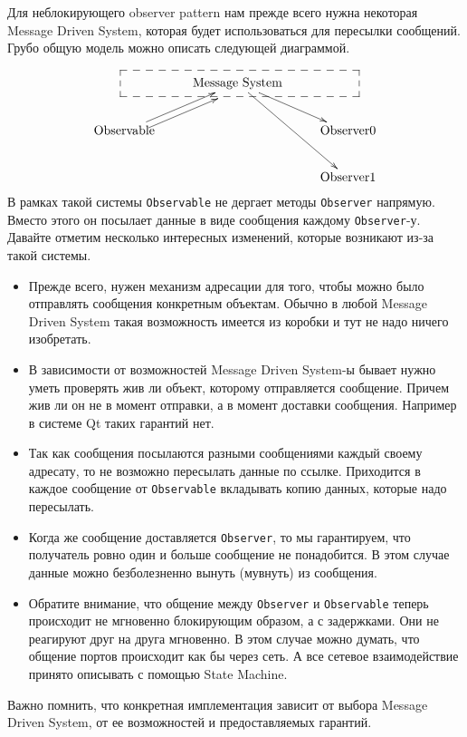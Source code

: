 Для неблокирующего observer pattern нам прежде всего нужна некоторая Message Driven System, которая будет использоваться для пересылки сообщений.
Грубо общую модель можно описать следующей диаграммой.

\[
\xymatrix{
  {\vphantom{\text{Message System}}}
    {\save
  [].[rr]*+[F--]\frm{}
  \restore
  }  
  &{\text{Message System}}\ar[rd]\ar[rdd]&{}\\
  {\text{Observable}}\ar[ru]<-0.5em>\ar[ru]&{}&{\text{Observer0}}\\
  {}&{}&{\text{Observer1}}\\
}
\]
В рамках такой системы \verb"Observable" не дергает методы \verb"Observer" напрямую.
Вместо этого он посылает данные в виде сообщения каждому \verb"Observer"-у.
Давайте отметим несколько интересных изменений, которые возникают из-за такой системы.
\begin{itemize}
\item Прежде всего, нужен механизм адресации для того, чтобы можно было отправлять сообщения конкретным объектам.
Обычно в любой Message Driven System такая возможность имеется из коробки и тут не надо ничего изобретать.

\item В зависимости от возможностей Message Driven System-ы бывает нужно уметь проверять жив ли объект, которому отправляется сообщение.
Причем жив ли он не в момент отправки, а в момент доставки сообщения.
Например в системе Qt таких гарантий нет.

\item Так как сообщения посылаются разными сообщениями каждый своему адресату, то не возможно пересылать данные по ссылке.
Приходится в каждое сообщение от \verb"Observable" вкладывать копию данных, которые надо пересылать.

\item Когда же сообщение доставляется \verb"Observer", то мы гарантируем, что получатель ровно один и больше сообщение не понадобится.
В этом случае данные можно безболезненно вынуть (мувнуть) из сообщения.

\item Обратите внимание, что общение между \verb"Observer" и \verb"Observable" теперь происходит не мгновенно блокирующим образом, а с задержками.
Они не реагируют друг на друга мгновенно.
В этом случае можно думать, что общение портов происходит как бы через сеть.
А все сетевое взаимодействие принято описывать с помощью State Machine.
\end{itemize}
Важно помнить, что конкретная имплементация зависит от выбора Message Driven System, от ее возможностей и предоставляемых гарантий.

